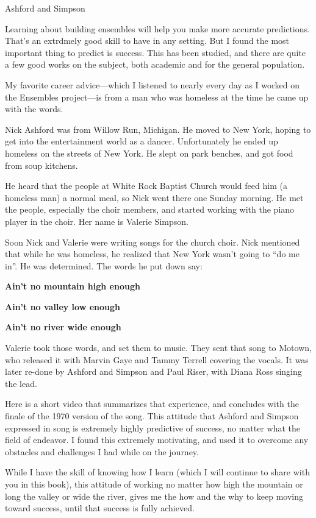 \documentclass[
]{book}
\begin{document}
Ashford and Simpson

Learning about building ensembles will help you make more accurate
predictions. That's an extrdmely good skill to have in any setting. But
I found the most important thing to predict is success. This has been
studied, and there are quite a few good works on the subject, both
academic and for the general population.

My favorite career advice---which I listened to nearly every day as I
worked on the Ensembles project---is from a man who was homeless at the
time he came up with the words.

Nick Ashford was from Willow Run, Michigan. He moved to New York, hoping
to get into the entertainment world as a dancer. Unfortunately he ended
up homeless on the streets of New York. He slept on park benches, and
got food from soup kitchens.

He heard that the people at White Rock Baptist Church would feed him (a
homeless man) a normal meal, so Nick went there one Sunday morning. He
met the people, especially the choir members, and started working with
the piano player in the choir. Her name is Valerie Simpson.

Soon Nick and Valerie were writing songs for the church choir. Nick
mentioned that while he was homeless, he realized that New York wasn't
going to ``do me in''. He was determined. The words he put down say:

\textbf{Ain't no mountain high enough}

\textbf{Ain't no valley low enough}

\textbf{Ain't no river wide enough}

Valerie took those words, and set them to music. They sent that song to
Motown, who released it with Marvin Gaye and Tammy Terrell covering the
vocals. It was later re-done by Ashford and Simpson and Paul Riser, with
Diana Ross singing the lead.

Here is a short video that summarizes that experience, and concludes
with the finale of the 1970 version of the song. This attitude that
Ashford and Simpson expressed in song is extremely highly predictive of
success, no matter what the field of endeavor. I found this extremely
motivating, and used it to overcome any obstacles and challenges I had
while on the journey.

While I have the skill of knowing how I learn (which I will continue to
share with you in this book), this attitude of working no matter how
high the mountain or long the valley or wide the river, gives me the how
and the why to keep moving toward success, until that success is fully
achieved.
\end{document}
